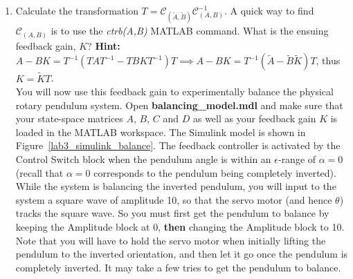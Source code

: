 \begin{enumerate}
\begin{enumerate}
              \item Calculate the transformation $T=\mathcal{C}_{(\tilde{A},\tilde{B})} \mathcal{C}_{(A,B)}^{-1}$. A quick way to find $\mathcal{C}_{(A,B)}$ is to use the \emph{ctrb(A,B)} MATLAB command. What is the ensuing feedback gain, $K$?
                    \textbf{Hint:} $A-BK= T^{-1}(TAT^{-1} - TBKT^{-1})T \implies A-BK = T^{-1}(\tilde{A}-\tilde{B}\tilde{K})T$, thus $K=\tilde{K}T$.\\

                    You will now use this feedback gain to experimentally balance the physical rotary pendulum system. Open \textbf{balancing\_model.mdl} and make sure that your state-space matrices $A$, $B$, $C$ and $D$ as well as your feedback gain $K$ is loaded in the MATLAB workspace. The Simulink model is shown in Figure~\ref{lab3_simulink_balance}. The feedback controller is activated by the Control Switch block when the pendulum angle is within an $\epsilon$-range of $\alpha = 0$ (recall that $\alpha=0$ corresponds to the pendulum being completely inverted). While the system is balancing the inverted pendulum, you will input to the system a square wave of amplitude 10, so that the servo motor (and hence $\theta$) tracks the square wave. So you must first get the pendulum to balance by keeping the Amplitude block at 0, \textbf{then} changing the Amplitude block to 10. Note that you will have to hold the servo motor when initially lifting the pendulum to the inverted orientation, and then let it go once the pendulum is completely inverted. It may take a few tries to get the pendulum to balance.


\end{enumerate}
\end{enumerate}
